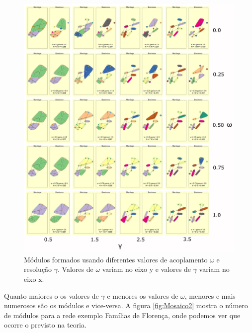 \documentclass[
  12pt,
]{article}
\begin{document}
\begin{figure}[h!]
    \centering
    \includegraphics[width=1\textwidth]{./Figuras/Mosaico_edit.png}
    \caption{Módulos formados usando diferentes valores de acoplamento $\omega$ e resolução $\gamma$. Valores de $\omega$ variam no eixo y e valores de $\gamma$ variam no eixo x.}
    \label{fig:Mosaico1}
\end{figure}

\pagebreak

Quanto maiores o os valores de \(\gamma\) e menores os valores de
\(\omega\), menores e mais numerosos são os módulos e vice-versa. A
figura \ref{fig:Mosaico2} mostra o número de módulos para a rede exemplo
Famílias de Florença, onde podemos ver que ocorre o previsto na teoria.
\end{document}
